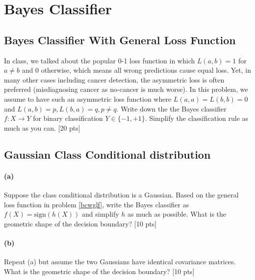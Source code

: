 \documentclass[twoside,10pt]{article}
\begin{document}
\vspace{1cm}

%

\section{Bayes Classifier}
\subsection{\label{bcwglf} Bayes Classifier With General Loss Function}
In class, we talked about the popular 0-1 loss function in which $L(a,b) = 1$ for $a\neq b$ and 0 otherwise, which means all wrong predictions cause equal loss. Yet, in many other cases including cancer detection, the asymmetric loss is often preferred (misdiagnosing cancer as no-cancer is much worse). In this problem, we assume to have such an asymmetric loss function where $L(a,a) = L(b,b) = 0$ and $L(a,b)=p, L(b,a) = q, p\neq q$. Write down
the the Bayes classifier $f:X\rightarrow Y$ for binary
classification $Y\in\{-1,+1\}$. Simplify the classification rule as much as you can. [20
pts]

\subsection{Gaussian Class Conditional distribution}
\paragraph{(a)} Suppose the class conditional distribution is a Gaussian.
Based on the general loss function in problem \ref{bcwglf}, write
the Bayes classifier as $f(X) = \text{sign}(h(X))$ and simplify $h$
as much as possible. What is the geometric shape of the decision
boundary? [10 pts]

\paragraph{(b)} Repeat (a) but assume the two Gaussians have identical
covariance matrices. What is the geometric shape of the decision
boundary? [10 pts]
\end{document}
